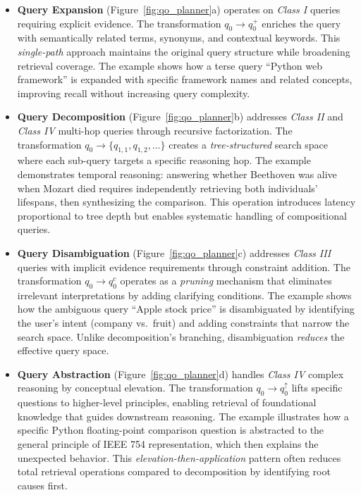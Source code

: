 \documentclass{article}
\begin{document}
\begin{itemize}[leftmargin=*,nosep]
\item \textbf{Query Expansion} (Figure~\ref{fig:qo_planner}a) operates on \textit{Class I} queries requiring explicit evidence. The transformation $q_0 \rightarrow q_0^+$ enriches the query with semantically related terms, synonyms, and contextual keywords. This \textit{single-path} approach maintains the original query structure while broadening retrieval coverage. The example shows how a terse query ``Python web framework'' is expanded with specific framework names and related concepts, improving recall without increasing query complexity.

\item \textbf{Query Decomposition} (Figure~\ref{fig:qo_planner}b) addresses \textit{Class II} and \textit{Class IV} multi-hop queries through recursive factorization. The transformation $q_0 \rightarrow \{q_{1,1}, q_{1,2}, \ldots\}$ creates a \textit{tree-structured} search space where each sub-query targets a specific reasoning hop. The example demonstrates temporal reasoning: answering whether Beethoven was alive when Mozart died requires independently retrieving both individuals' lifespans, then synthesizing the comparison. This operation introduces latency proportional to tree depth but enables systematic handling of compositional queries.

\item \textbf{Query Disambiguation} (Figure~\ref{fig:qo_planner}c) addresses \textit{Class III} queries with implicit evidence requirements through constraint addition. The transformation $q_0 \rightarrow q_0^c$ operates as a \textit{pruning} mechanism that eliminates irrelevant interpretations by adding clarifying conditions. The example shows how the ambiguous query ``Apple stock price'' is disambiguated by identifying the user's intent (company vs.\ fruit) and adding constraints that narrow the search space. Unlike decomposition's branching, disambiguation \textit{reduces} the effective query space.

\item \textbf{Query Abstraction} (Figure~\ref{fig:qo_planner}d) handles \textit{Class IV} complex reasoning by conceptual elevation. The transformation $q_0 \rightarrow q_0^\uparrow$ lifts specific questions to higher-level principles, enabling retrieval of foundational knowledge that guides downstream reasoning. The example illustrates how a specific Python floating-point comparison question is abstracted to the general principle of IEEE 754 representation, which then explains the unexpected behavior. This \textit{elevation-then-application} pattern often reduces total retrieval operations compared to decomposition by identifying root causes first.
\end{itemize}
\end{document}
